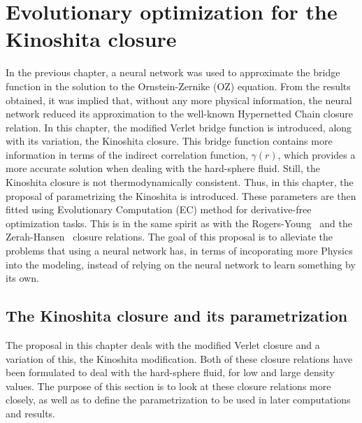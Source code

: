 \chapter{Evolutionary optimization for the Kinoshita closure}
\label{Cap5}

In the previous chapter, a neural network was used to approximate the bridge function in 
the solution to the Ornstein-Zernike (OZ) equation. From the results obtained, it was 
implied that, without any more physical information, the neural network reduced its 
approximation to the well-known Hypernetted Chain closure relation. In this chapter, the 
modified Verlet bridge function is introduced, along with its variation, the Kinoshita 
closure. This bridge function contains more information in terms of the indirect 
correlation function, \(\gamma(r)\), which provides a more accurate solution when dealing 
with the hard-sphere fluid. Still, the Kinoshita closure is not thermodynamically 
consistent. Thus, in this chapter, the proposal of parametrizing the Kinoshita is 
introduced. These parameters are then fitted using Evolutionary Computation (EC) method for 
derivative-free optimization tasks. This is in the same spirit as with the 
Rogers-Young~\cite{rogersNewThermodynamicallyConsistent1984b} and the 
Zerah-Hansen~\cite{zerahSelfConsistentIntegral1986} closure relations. The goal of this 
proposal is to alleviate the problems that using a neural network has, in terms of 
incoporating more Physics into the modeling, instead of relying on the neural network to 
learn something by its own.

\section{The Kinoshita closure and its parametrization}
The proposal in this chapter deals with the modified Verlet closure and a variation of 
this, the Kinoshita modification. Both of these closure relations have been formulated to 
deal with the hard-sphere fluid, for low and large density values. The purpose of this 
section is to look at these closure relations more closely, as well as to define the 
parametrization to be used in later computations and results.

